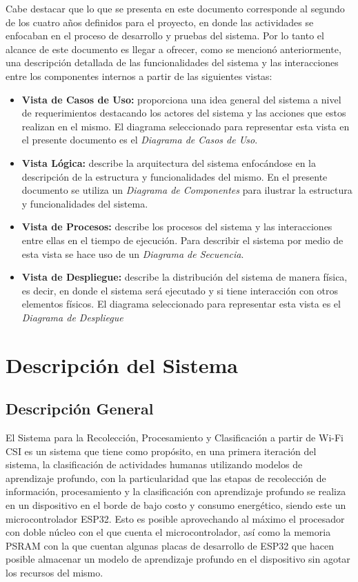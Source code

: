 \documentclass{scrreprt}
\begin{document}
Cabe destacar que lo que se presenta en este documento corresponde al segundo de los cuatro años definidos para el proyecto, en donde las actividades se enfocaban en el proceso de desarrollo y pruebas del sistema. Por lo tanto el alcance de este documento es llegar a ofrecer, como se mencionó anteriormente, una descripción detallada de las funcionalidades del sistema y las interacciones entre los componentes internos a partir de las siguientes vistas: 
\begin{itemize}
    \item \textbf{Vista de Casos de Uso: } proporciona una idea general del sistema a nivel de requerimientos destacando los actores del sistema y las acciones que estos realizan en el mismo. El diagrama seleccionado para representar esta vista en el presente documento es el \emph{Diagrama de Casos de Uso}.
    \item \textbf{Vista Lógica: } describe la arquitectura del sistema enfocándose en la descripción de la estructura y funcionalidades del mismo. En el presente documento se utiliza un \emph{Diagrama de Componentes} para ilustrar la estructura y funcionalidades del sistema. 
    \item \textbf{Vista de Procesos: } describe los procesos del sistema y las interacciones entre ellas en el tiempo de ejecución. Para describir el sistema por medio de esta vista se hace uso de un \emph{Diagrama de Secuencia}. 
    \item \textbf{Vista de Despliegue: } describe la distribución del sistema de manera física, es decir, en donde el sistema será ejecutado y si tiene interacción con otros elementos físicos. El diagrama seleccionado para representar esta vista es el \emph{Diagrama de Despliegue}
\end{itemize}

\chapter{Descripción del Sistema}

\section{Descripción General}
El Sistema para la Recolección, Procesamiento y Clasificación a partir de Wi-Fi CSI es un sistema que tiene como propósito, en una primera iteración del sistema, la clasificación de actividades humanas utilizando modelos de aprendizaje profundo, con la particularidad que las etapas de  recolección de información, procesamiento y la clasificación con aprendizaje profundo se realiza en un dispositivo en el borde de bajo costo y consumo energético, siendo este un microcontrolador ESP32. Esto es posible aprovechando al máximo el procesador con doble núcleo con el que cuenta el microcontrolador, así como la memoria PSRAM con la que cuentan algunas placas de desarrollo de ESP32 que hacen posible almacenar un modelo de aprendizaje profundo en el dispositivo sin agotar los recursos del mismo. 
\end{document}
